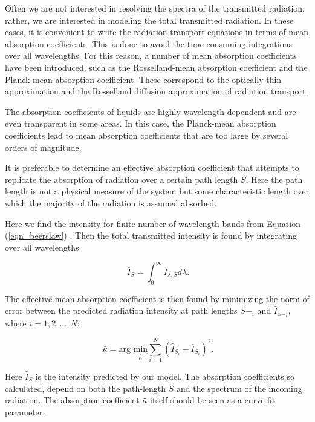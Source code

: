 Often we are not interested in resolving the spectra of the transmitted radiation; rather, we are interested in modeling the total transmitted radiation. In these cases, it is convenient to write the radiation transport equations in terms of mean absorption coefficients. This is done to avoid the time-consuming integrations over all wavelengths. For this reason, a number of mean absorption coefficients have been introduced, such as the Rosselland-mean absorption coefficient and the Planck-mean absorption coefficient. These correspond to the optically-thin approximation and the Rosselland diffusion approximation of radiation transport.

The absorption coefficients of liquids are highly wavelength dependent and are even transparent in some areas. In this case, the Planck-mean absorption coefficients lead to mean absorption coefficients that are too large by several orders of magnitude.

It is preferable to determine an effective absorption coefficient that attempts to replicate the absorption of radiation over a certain path length $S$. Here the path length is not a physical measure of the system but some characteristic length over which the majority of the radiation is assumed absorbed.

Here we find the intensity for finite number of wavelength bands from Equation (\ref{eqn_beerslaw}) . Then the total transmitted intensity is found by integrating over all wavelengths

\begin{equation}
\label{eqn_totintens}
     \ \bar{I}_S = \int_{0}^{\infty} I_{\lambda,S} d\lambda \mbox{.}
\end{equation}

The effective mean absorption coefficient is then found by minimizing the norm of error between the predicted radiation intensity at path lengths $S-_i$ and $\bar{I}_{S-_i}$, where $i=1,2,...,N$:

\begin{equation}
\label{eqn_effcoeff}
     \ \bar{\kappa} = \mbox{arg } \underbrace{\mbox{min}}_{\kappa} \sum_{i=1}^{N} \left(\hat{I}_{S_i}-\bar{I}_{S_i}\right)^{2}  \mbox{.}
\end{equation}

Here $\hat{I}_S$ is the intensity predicted by our model.  The absorption coefficients so calculated, depend on both the path-length $S$ and the spectrum of the incoming radiation. The absorption coefficient $\bar{\kappa}$ itself should be seen as a curve fit parameter.

